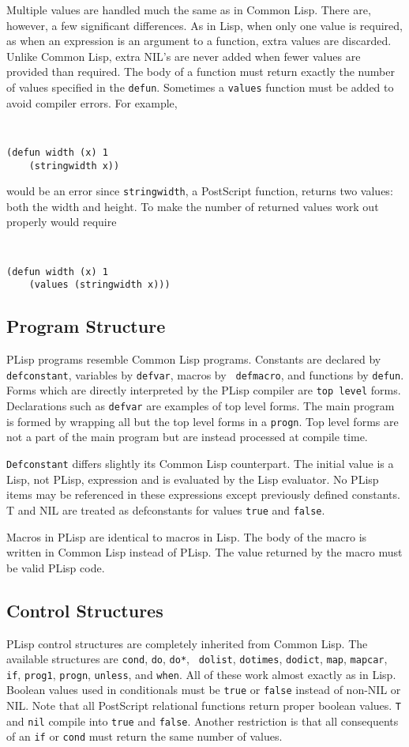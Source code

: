 Multiple values are handled much the same as in Common Lisp.  There are,
however, a few significant differences.  As in Lisp, when only
one value is required, as when an expression is an argument to a
function, extra values 
are discarded.  Unlike Common Lisp, extra NIL's are never added when fewer
values are provided than required.  The body of a function must return
exactly the number of values specified in the {\tt defun}.
Sometimes a {\tt values} function must be
added to avoid compiler errors.  For example, 
{\tt
\begin{verbatim}
(defun width (x) 1
    (stringwidth x))
\end{verbatim}} \noindent would be an error since {\tt stringwidth}, a
PostScript function, returns two values: both the
width and height.  To make the number of returned values work out
properly would require
{\tt
\begin{verbatim}
(defun width (x) 1
    (values (stringwidth x)))
\end{verbatim}
}

\subsection{Program Structure}
PLisp programs resemble Common Lisp programs.  Constants are declared by
{\tt defconstant}, variables by {\tt defvar}, macros by {\tt
defmacro}, and functions by 
{\tt defun}.  Forms which are directly interpreted by the PLisp
compiler are {\tt top level} forms.  Declarations such as {\tt defvar}
are examples of top level forms.
The main program is formed by wrapping all but the
top level forms in a {\tt progn}.  Top level forms are
not a part of the main program but are instead processed at compile
time.

{\tt Defconstant} differs slightly its Common Lisp counterpart.  The initial
value is a Lisp, not PLisp, expression and is evaluated by the Lisp
evaluator.  No PLisp items may be referenced in these expressions
except previously defined constants.  T and NIL are treated as
defconstants for values {\tt true} and {\tt false}.

Macros in PLisp are identical to macros in Lisp.  The body of the
macro is written in Common Lisp instead of PLisp.  The value returned by the
macro must be valid PLisp code.

\subsection{Control Structures}
PLisp control structures are completely inherited from Common Lisp.  The
available structures are {\tt cond}, {\tt do}, {\tt do*}, {\tt
dolist}, {\tt dotimes}, {\tt dodict}, {\tt map}, {\tt mapcar}, {\tt if},
{\tt prog1}, {\tt progn}, {\tt unless}, and {\tt when}.
All of these work almost exactly as in Lisp.
Boolean values used in conditionals must be {\tt true} or {\tt false}
instead of 
non-NIL or NIL.  Note that all PostScript relational functions return
proper boolean values.  {\tt T} and {\tt nil} compile into {\tt true}
and {\tt false}.
Another restriction is that all
consequents of an {\tt if} or {\tt cond} must return the same number of values.

